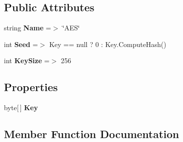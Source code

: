 \subsection*{Public Attributes}
\begin{DoxyCompactItemize}
\item 
string {\bfseries Name} =$>$ \char`\"{}A\+ES\char`\"{}\hypertarget{class_stegosaurus_1_1_cryptography_1_1_a_e_s_provider_aa0a1b3560b0c4a8c2fe39b363e80d853}{}\label{class_stegosaurus_1_1_cryptography_1_1_a_e_s_provider_aa0a1b3560b0c4a8c2fe39b363e80d853}

\item 
int {\bfseries Seed} =$>$ Key == null ? 0 \+: Key.\+Compute\+Hash()\hypertarget{class_stegosaurus_1_1_cryptography_1_1_a_e_s_provider_a2dff11140dc512ee712c08061d878d53}{}\label{class_stegosaurus_1_1_cryptography_1_1_a_e_s_provider_a2dff11140dc512ee712c08061d878d53}

\item 
int {\bfseries Key\+Size} =$>$ 256\hypertarget{class_stegosaurus_1_1_cryptography_1_1_a_e_s_provider_a7383e60bd76754dd3a2e75cb2e06876f}{}\label{class_stegosaurus_1_1_cryptography_1_1_a_e_s_provider_a7383e60bd76754dd3a2e75cb2e06876f}

\end{DoxyCompactItemize}
\subsection*{Properties}
\begin{DoxyCompactItemize}
\item 
byte\mbox{[}$\,$\mbox{]} {\bfseries Key}\hypertarget{class_stegosaurus_1_1_cryptography_1_1_a_e_s_provider_ad657916d9256db7404625166c03c0603}{}\label{class_stegosaurus_1_1_cryptography_1_1_a_e_s_provider_ad657916d9256db7404625166c03c0603}

\end{DoxyCompactItemize}


\subsection{Member Function Documentation}
